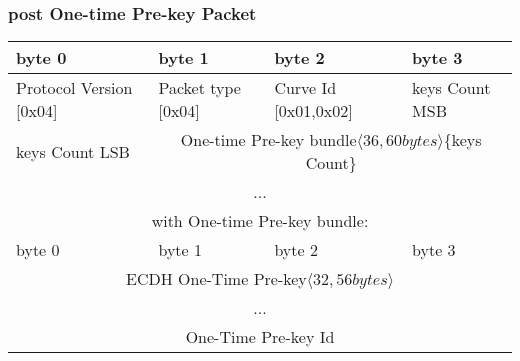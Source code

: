 \documentclass[a4paper,11pt]{article}
\begin{document}
    \subsubsection{post One-time Pre-key Packet}
      \begin{center}
      \begin{tabular}{ | p{1.4in} | p{1.4in} | p{1.4in} | p{1.4in} |}
        \hline
        \cellcolor[gray]{0.85} byte 0 & \cellcolor[gray]{0.85} byte 1 & \cellcolor[gray]{0.85} byte 2 & \cellcolor[gray]{0.85}byte 3\\
        \hline
        Protocol Version [0x04] & Packet type [0x04] & Curve Id [0x01,0x02] & keys Count MSB\\
        \hline
        keys Count LSB & \multicolumn{3}{|c|}{One-time Pre-key bundle$\langle 36,60bytes\rangle $\{keys Count\}}\\
        \cline{1-1}
        \multicolumn{4}{|c|}{...}\\
        \hline
        \multicolumn{4}{c}{with One-time Pre-key bundle:}\\
        \hline
        \cellcolor[gray]{0.95} byte 0 & \cellcolor[gray]{0.95} byte 1 & \cellcolor[gray]{0.95} byte 2 & \cellcolor[gray]{0.95}byte 3\\
        \hline
        \multicolumn{4}{|c|}{ECDH One-Time Pre-key$\langle 32,56bytes\rangle$}\\
        \multicolumn{4}{|c|}{...}\\
        \hline
        \multicolumn{4}{|c|}{One-Time Pre-key Id}\\
        \hline
      \end{tabular}
      \end{center}
     
\end{document}
